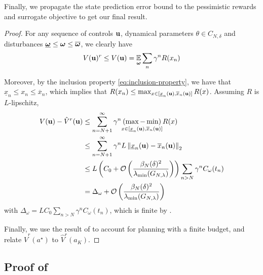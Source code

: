 \documentclass{article}
\begin{document}
Finally, we propagate the state prediction error bound to the pessimistic rewards and surrogate objective to get our final result.
\begin{proof}
	For any sequence of controls $\mathbf{u}$, dynamical parameters $\theta\in C_{N,\delta}$ and disturbances $\underline{\bm{\omega}} \leq \bm{\omega} \leq \overline{\bm{\omega}}$, we clearly have 
	\[V(\mathbf{u})^r \leq V(\mathbf{u}) = \operatorname*{\mathbb{E}}_{\bm{\omega}}\sum_n \gamma^n R(x_n)\]
	
	Moreover, by the inclusion property \eqref{eq:inclusion-property}, we have that $\underline{x}_n \leq x_n \leq \overline{x}_n$, which implies that $R(x_n) \leq \max_{x\in[\underline{x}_n(\mathbf{u}), \overline{x}_n(\mathbf{u})]}  R(x)$. Assuming $R$ is $L$-lipschitz,
	\begin{align*}
	V(\mathbf{u}) - \hat{V}^r(\mathbf{u}) &\leq \sum_{n=N+1}^\infty \gamma^n \underset{{x\in[\underline{x}_n(\mathbf{u}), \overline{x}_n(\mathbf{u})]}}{(\max - \min)} R(x)\\
	&\leq \sum_{n=N+1}^\infty \gamma^n L \left\|\underline{x}_n(\mathbf{u}) - \overline{x}_n(\mathbf{u})\right\|_2\\
	&\leq L\left(C_0 + \mathcal{O}\left({\frac{\beta_N(\delta)^2}{\lambda_{\min}(G_{N,\lambda})}}\right)\right) \sum_{n>N} \gamma^n C_{\omega}(t_n)\\
	&= \Delta_\omega + \mathcal{O}\left({\frac{\beta_N(\delta)^2}{\lambda_{\min}(G_{N,\lambda})}}\right)
	\end{align*}
	with $\Delta_\omega = L C_0\sum_{n>N} \gamma^n C_{\omega}(t_n)$, which is finite by .
	
	Finally, we use the result of  to account for planning with a finite budget, and relate $\hat{V}^r(a^\star)$ to $\hat{V}^r(a_K)$.
\end{proof}

\subsection{Proof of }
\label{sec:proof-pe}
\end{document}
